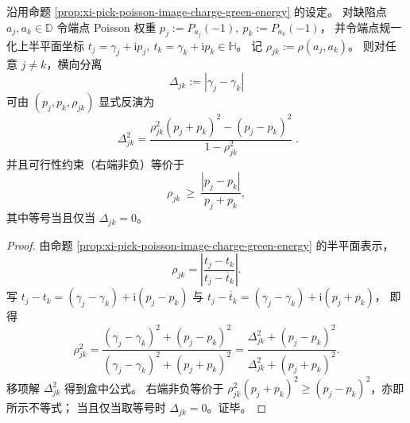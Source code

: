 \begin{theorem}[端点锚定伪双曲几何的横向分离反演公式]\label{thm:xi-pick-poisson-anchored-transverse-separation-inversion}
沿用命题 \ref{prop:xi-pick-poisson-image-charge-green-energy} 的设定。
对缺陷点 \(a_j,a_k\in\mathbb D\) 令端点 Poisson 权重
\(
p_j:=P_{a_j}(-1),\ p_k:=P_{a_k}(-1)
\)，
并令端点规一化上半平面坐标
\(
t_j=\gamma_j+\mathrm{i}p_j,\ t_k=\gamma_k+\mathrm{i}p_k\in\mathbb H
\)。
记 \(\rho_{jk}:=\rho(a_j,a_k)\)。
则对任意 \(j\neq k\)，横向分离
\[
\Delta_{jk}:=|\gamma_j-\gamma_k|
\]
可由 \((p_j,p_k,\rho_{jk})\) 显式反演为
\[
\boxed{\;
\Delta_{jk}^2
=\frac{\rho_{jk}^2(p_j+p_k)^2-(p_j-p_k)^2}{1-\rho_{jk}^2}\; }.
\]
并且可行性约束（右端非负）等价于
\[
\rho_{jk}\ \ge\ \frac{|p_j-p_k|}{p_j+p_k},
\]
其中等号当且仅当 \(\Delta_{jk}=0\)。
\end{theorem}
\begin{proof}
由命题 \ref{prop:xi-pick-poisson-image-charge-green-energy} 的半平面表示，
\[
\rho_{jk}
=\left|\frac{t_j-t_k}{t_j-\overline t_k}\right|.
\]
写
\(
t_j-t_k=(\gamma_j-\gamma_k)+\mathrm{i}(p_j-p_k)
\)
与
\(
t_j-\overline t_k=(\gamma_j-\gamma_k)+\mathrm{i}(p_j+p_k)
\)，
即得
\[
\rho_{jk}^2
=\frac{(\gamma_j-\gamma_k)^2+(p_j-p_k)^2}{(\gamma_j-\gamma_k)^2+(p_j+p_k)^2}
=\frac{\Delta_{jk}^2+(p_j-p_k)^2}{\Delta_{jk}^2+(p_j+p_k)^2}.
\]
移项解 \(\Delta_{jk}^2\) 得到盒中公式。
右端非负等价于 \(\rho_{jk}^2(p_j+p_k)^2\ge (p_j-p_k)^2\)，亦即所示不等式；
当且仅当取等号时 \(\Delta_{jk}=0\)。证毕。
\end{proof}

